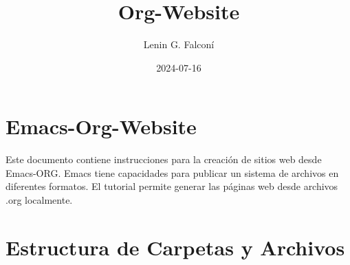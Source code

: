 \documentclass{article}
\author{Lenin G. Falconí}
\date{2024-07-16}
\title{Org-Website}
\begin{document}
\maketitle
\tableofcontents

\thispagestyle{fancy}
\section{Emacs-Org-Website}
\label{sec:orgdcb47e2}

Este documento contiene instrucciones para la creación de sitios web
desde Emacs-ORG. Emacs tiene capacidades para publicar un sistema de
archivos en diferentes formatos. El tutorial permite generar las
páginas web desde archivos .org localmente.
\section{Estructura de Carpetas y Archivos}
\label{sec:org8bfa3ec}
\end{document}
